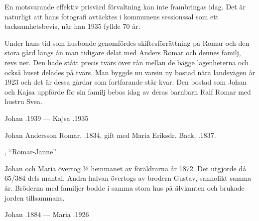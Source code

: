 En motsvarande effektiv prisvärd förvaltning kan inte frambringas idag. Det är naturligt att hans fotografi avtäcktes i kommunens sessionssal som ett tacksamhetsbevis, när han 1935 fyllde 70 år.

Under hans tid som husbonde genomfördes skiftesförrättning på Romar och den stora gård längs ån man tidigare delat med Anders Romar och dennes familj, revs ner. Den hade stått precis tvärs över rån mellan de bägge lägenheterna och också huset delades på tvärs. Man byggde nu varsin ny bostad nära landsvägen år 1923 och det är dessa gårdar som fortfarande står kvar. Den bostad som Johan och Kajsa uppförde för sin familj bebos idag av deras barnbarn Ralf Romar med hustru Svea.

Johan .1939  ---  Kajsa .1935


%

%
Johan Andersson Romar, .1834, gift med Maria Eriksdr. Back, .1837.
\begin{jhchildren}
  \item {}
  \item {}, ``Romar-Janne''
  \item {}
\end{jhchildren}
Johan och Maria övertog ½ hemmanet av föräldrarna år 1872. Det utgjorde då 65/384 dels mantal. Andra halvan övertogs av brodern Gustav, sannolikt samma år. Bröderna med familjer bodde i samma stora hus på älvkanten och brukade jorden tillsammans.

Johan .1884  ---  Maria .1926


